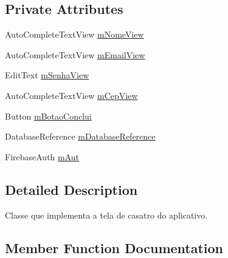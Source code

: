 \subsection*{Private Attributes}
\begin{DoxyCompactItemize}
\item 
Auto\+Complete\+Text\+View \mbox{\hyperlink{classbr_1_1unb_1_1cic_1_1mp_1_1marketmaster_1_1CadastroActivity_aae8bf63d5b9d9daef33ecac15af76bef}{m\+Nome\+View}}
\item 
Auto\+Complete\+Text\+View \mbox{\hyperlink{classbr_1_1unb_1_1cic_1_1mp_1_1marketmaster_1_1CadastroActivity_a481e1bf46e0ae9f0932dc9e6dfd65e05}{m\+Email\+View}}
\item 
Edit\+Text \mbox{\hyperlink{classbr_1_1unb_1_1cic_1_1mp_1_1marketmaster_1_1CadastroActivity_aad33c23a55a1328d74f3d43ffd8ed4f7}{m\+Senha\+View}}
\item 
Auto\+Complete\+Text\+View \mbox{\hyperlink{classbr_1_1unb_1_1cic_1_1mp_1_1marketmaster_1_1CadastroActivity_a262e4ad6ffa4eee6586321f67256f6e7}{m\+Cep\+View}}
\item 
Button \mbox{\hyperlink{classbr_1_1unb_1_1cic_1_1mp_1_1marketmaster_1_1CadastroActivity_a5e652b5e6745695d7e938a62f6728898}{m\+Botao\+Conclui}}
\item 
Database\+Reference \mbox{\hyperlink{classbr_1_1unb_1_1cic_1_1mp_1_1marketmaster_1_1CadastroActivity_ab7706328f152aba552d89f56c9060bf4}{m\+Database\+Reference}}
\item 
Firebase\+Auth \mbox{\hyperlink{classbr_1_1unb_1_1cic_1_1mp_1_1marketmaster_1_1CadastroActivity_a9ba27388432400ad4f6650ef6c7b2986}{m\+Aut}}
\end{DoxyCompactItemize}


\subsection{Detailed Description}
Classe que implementa a tela de casatro do aplicativo. 

\subsection{Member Function Documentation}
\mbox{\label{classbr_1_1unb_1_1cic_1_1mp_1_1marketmaster_1_1CadastroActivity_abac9fe49bd63de5b80938e71079bf0f4}} 
